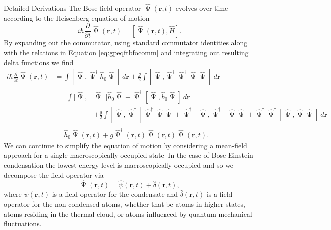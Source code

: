 \begin{chapter}{Detailed Derivations\label{app:App2}}
The Bose field operator $\hat{\upPsi}(\mathbf{r},t)$ evolves over time according to the Heisenberg equation of motion
\begin{equation*}
i \hbar\frac{\partial}{\partial t}\hat{\upPsi}(\mathbf{r},t) = [\hat{\upPsi}(\mathbf{r},t), \hat{H}].
\end{equation*}
By expanding out the commutator, using standard commutator identities along with the relations in Equation \ref{eq:gpeqftbfocomm} and integrating out resulting delta functions we find 
\begin{equation}
\begin{split}
i \hbar\frac{\partial}{\partial t}\hat{\upPsi}(\mathbf{r},t) &= \int [\hat{\upPsi}, \hat{\upPsi}^\dagger \hat{h}_0 \hat{\upPsi}]~d\mathbf{r}+ \frac{g}{2}\int[\hat{\upPsi}, \hat{\upPsi}^\dagger\hat{\upPsi}^\dagger\hat{\upPsi}\hat{\upPsi}]~d\mathbf{r}\\
&
\begin{split}
=\int [\hat{\upPsi}, &\hat{\upPsi}^\dagger]\hat{h}_0 \hat{\upPsi} + \hat{\upPsi}^\dagger[\hat{\upPsi},\hat{h}_0 \hat{\upPsi}]~d\mathbf{r}\\
&+\frac{g}{2}\int[\hat{\upPsi},\hat{\upPsi}^\dagger]\hat{\upPsi}^\dagger\hat{\upPsi}\hat{\upPsi}+ \hat{\upPsi}^\dagger[\hat{\upPsi},\hat{\upPsi}^\dagger]\hat{\upPsi}\hat{\upPsi} + \hat{\upPsi}^\dagger\hat{\upPsi}^\dagger[\hat{\upPsi},\hat{\upPsi}\hat{\upPsi}] ~d\mathbf{r}\end{split}\\
&= \hat{h}_0\hat{\upPsi}(\mathbf{r},t) + g\hat{\upPsi}^\dagger(\mathbf{r},t)\hat{\upPsi}(\mathbf{r},t)\hat{\upPsi}(\mathbf{r},t).
\end{split}
\label{eq:gpeqfthem}
\end{equation}
We can continue to simplify the equation of motion by considering a mean-field approach for a single macroscopically occupied state. In the case of Bose-Einstein condensation the lowest energy level is macroscopically occupied and so we decompose the field operator via 
\begin{equation*}
\hat{\upPsi}(\mathbf{r},t) = \hat{\psi}(\mathbf{r},t) + \hat{\delta}(\mathbf{r},t),
\end{equation*}
where $\psi(\mathbf{r},t)$ is a field operator for the condensate and $\hat{\delta}(\mathbf{r},t)$ is a field operator for the non-condensed atoms, whether that be atoms in higher states, atoms residing in the thermal cloud, or atoms influenced by quantum mechanical fluctuations. 


\end{chapter}
